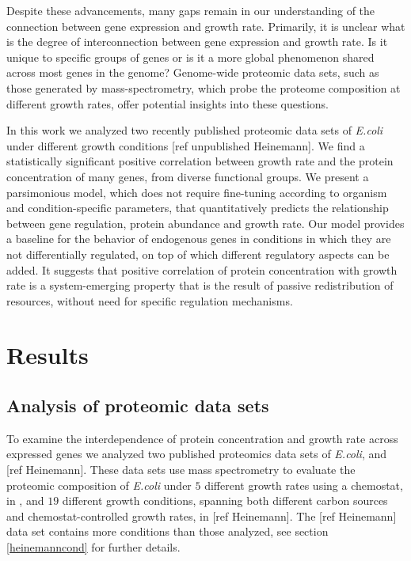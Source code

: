 \documentclass[notitlepage]{article}
\begin{document}
Despite these advancements, many gaps remain in our understanding of the connection between gene expression and growth rate.
Primarily, it is unclear what is the degree of interconnection between gene expression and growth rate.
Is it unique to specific groups of genes or is it a more global phenomenon shared across most genes in the genome?
Genome-wide proteomic data sets, such as those generated by mass-spectrometry, which probe the proteome composition at different growth rates, offer potential insights into these questions.

In this work we analyzed two recently published proteomic data sets of \emph{E.coli} under different growth conditions \cite{Valgepea2013} [ref unpublished Heinemann].
We find a statistically significant positive correlation between growth rate and the protein concentration of many genes, from diverse functional groups.
We present a parsimonious model, which does not require fine-tuning according to organism and condition-specific parameters, that quantitatively predicts the relationship between gene regulation, protein abundance and growth rate.
Our model provides a baseline for the behavior of endogenous genes in conditions in which they are not differentially regulated, on top of which different regulatory aspects can be added.
It suggests that positive correlation of protein concentration with growth rate is a system-emerging property that is the result of passive redistribution of resources, without need for specific regulation mechanisms.

\section{Results}
\subsection{Analysis of proteomic data sets}
To examine the interdependence of protein concentration and growth rate across expressed genes we analyzed two published proteomics data sets of \emph{E.coli}, \cite{Valgepea2013} and [ref Heinemann].
These data sets use mass spectrometry to evaluate the proteomic composition of \emph{E.coli} under $5$ different growth rates using a chemostat, in \cite{Valgepea2013}, and $19$ different growth conditions, spanning both different carbon sources and chemostat-controlled growth rates, in [ref Heinemann].
The [ref Heinemann] data set contains more conditions than those analyzed, see section \ref{heinemanncond} for further details.
\end{document}
